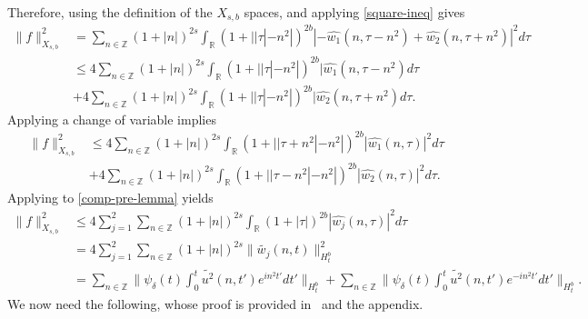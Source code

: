 \documentclass[12pt,reqno]{amsart}
\numberwithin{equation}{section}  %
\newcommand{\rr}{\mathbb{R}}
\newcommand{\zz}{\mathbb{Z}}
\newcommand{\wh}{\widehat}
\newcommand{\wt}{\widetilde}
\begin{document}
\begin{appendices}
\begin{equation}
\end{equation}
%
%
Therefore, using the definition of the $X_{s,b}$ spaces, and applying
\eqref{square-ineq} gives 
%
%
\begin{equation*}
\begin{split}
  \| f \|_{X_{s,b}}^{2}
  & = \sum_{n \in \zz} (1 + |n|)^{2s} \int_{\rr} (1 + |
  | \tau | - n^{2} |)^{2b} | -\wh{w_{1}}(n, \tau - n^{2}) + \wh{w_{2}}(n, \tau +
  n^{2}) |^{2} d \tau
  \\
  & \le 4 \sum_{n \in \zz} (1 + |n|)^{2s} \int_{\rr} (1 + |
  | \tau | - n^{2} |)^{2b} | \wh{w_{1}}(n, \tau - n^{2}) d \tau
  \\
  & + 4 \sum_{n \in \zz} (1 + |n|)^{2s} \int_{\rr} (1 + |
  | \tau | - n^{2} |)^{2b} | \wh{w_{2}}(n, \tau + n^{2}) d \tau.
\end{split}
\end{equation*}
%
%
Applying a change of variable implies
%
%
%
%
\begin{equation}
\begin{split}
  \| f \|_{X_{s,b}}^{2}
  & \le 4 \sum_{n \in \zz} (1 + |n|)^{2s} \int_{\rr} (1 + |
  | \tau + n^{2} | - n^{2} |)^{2b} | \wh{w_{1}}(n, \tau) |^2 d \tau
  \\
  & + 4 \sum_{n \in \zz} (1 + |n|)^{2s} \int_{\rr} (1 + |
  | \tau - n^{2} | - n^{2} |)^{2b} | \wh{w_{2}}(n, \tau )|^2 d \tau.
\end{split}
\label{comp-pre-lemma}
\end{equation}
%
%
%
Applying  to \eqref{comp-pre-lemma} yields
%
%
\begin{equation}
  \label{pre-smoothing-lem}
\begin{split}
\| f \|_{X_{s,b}}^{2}
  & \le 4 \sum_{j=1}^{2}  \sum_{n \in \zz} (1 + |n|)^{2s} \int_{\rr} (1 + |
  \tau|)^{2b} | \wh{w_{j}}(n, \tau)|^2 d \tau
  \\
  & = 4 \sum_{j=1}^{2} \sum_{n \in \zz} (1 + |n|)^{2s} \|\wt{w_{j}}(n, t)
  \|^{2}_{H_{t}^{b}}
  \\
  & = \sum_{n \in \zz} \| \psi_{\delta}(t) \int_{0}^{t} \wt{u^2}(n, t')
  e^{in^{2}t'}dt'  \|_{H_{t}^{b}}
  + 
  \sum_{n \in \zz} \| \psi_{\delta}(t) \int_{0}^{t} \wt{u^2}(n, t')
  e^{-in^{2}t'}dt'  \|_{H_{t}^{b}}.
\end{split}
\end{equation}
%
We now need the following, whose proof is provided in~\cite{Ginibre:1996fk} and
the appendix.
%
%
%
%
%
%

\end{appendices}
\end{document}
